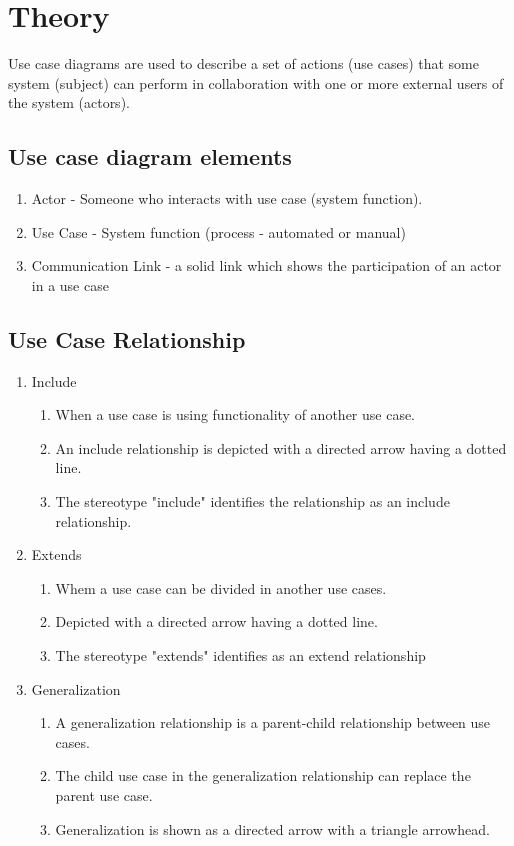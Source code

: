 \documentclass[12pt,a4paper,titlepage]{article}
\begin{document}
\section{Theory}
Use case diagrams are used to describe a set of actions (use cases) that some system (subject) can perform in collaboration with one or more external users of the system (actors).

\subsection{Use case diagram elements}
\begin{enumerate}  
	\item Actor - Someone who interacts with use case (system function).
	\item Use Case - System function (process - automated or manual)
	\item Communication Link - a solid link which shows the participation of an actor in a use case 
\end{enumerate}


\subsection{Use Case Relationship}
\begin{enumerate}  

	\item Include
	\begin{enumerate}
		\item When a use case is using functionality of another use case.
		\item An include relationship is depicted with a directed arrow having a dotted line. 
		\item The stereotype "include" identifies the relationship as an include relationship.
	\end{enumerate}
	\item Extends
	\begin{enumerate}  
		\item Whem a use case can be divided in another use cases.
		\item Depicted with a directed arrow having a dotted line. 
		\item The stereotype "extends" identifies as an extend relationship
	\end{enumerate}
	\item Generalization
	\begin{enumerate}  
		\item A generalization relationship is a parent-child relationship between use cases.
		\item The child use case in the generalization relationship can replace the parent use case.
		\item Generalization is shown as a directed arrow with a triangle arrowhead.
	\end{enumerate}
\end{enumerate}
\end{document}
